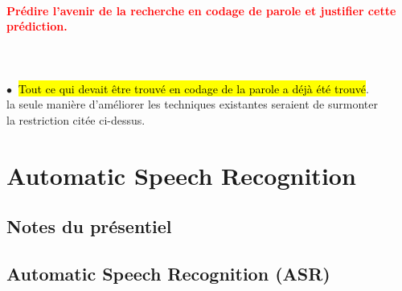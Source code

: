 \documentclass[letterpaper, 12pt]{article}
\newcommand{\alinea}{
\hspace*{0.3cm}}
\newcommand{\red}[1]{
	\textcolor{red}{#1}
}
\newcommand{\green}[1]{
	\textcolor{darkgreen}{#1}
}
\newcommand{\point}{$\bullet\ $}
\begin{document}
		\paragraph{\red{Prédire l'avenir de la recherche en codage de parole et justifier cette prédiction.}}~\\~\\
			\point\hl{ Tout ce qui devait \^etre trouv\'e en codage de la parole a d\'ej\`a \'et\'e trouv\'e}.
				\\\alinea la seule manière d'améliorer les techniques existantes seraient de surmonter
				\\\alinea la restriction citée ci-dessus.
\pagebreak		
\section{Automatic Speech Recognition}
	\subsection{Notes du présentiel}
		\paragraph{\green{}}
		
		\paragraph{\green{}}
		
		\pagebreak
	\subsection{Automatic Speech Recognition (ASR)}
\end{document}
